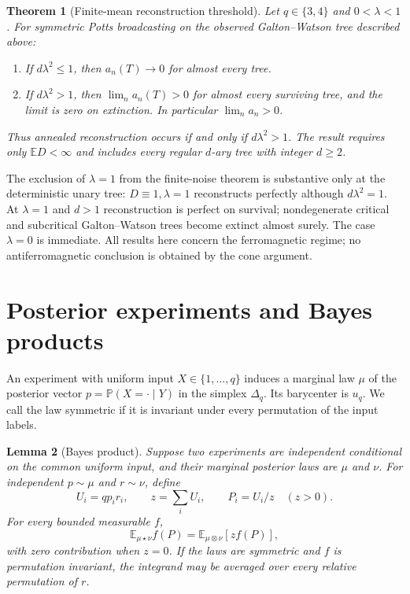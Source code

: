 \documentclass[11pt,reqno]{amsart}
\newtheorem{theorem}{Theorem}[section]
\newtheorem{lemma}[theorem]{Lemma}
\theoremstyle{definition}
\theoremstyle{remark}
\newcommand{\E}{\mathbb E}
\newcommand{\Prob}{\mathbb P}
\begin{document}
\begin{theorem}[Finite-mean reconstruction threshold]\label{thm:main}
Let $q\in\{3,4\}$ and $0<\lambda<1$. For symmetric Potts broadcasting on the observed Galton--Watson tree described above:
\begin{enumerate}
\item If $d\lambda^2\le1$, then $a_n(T)\to0$ for almost every tree.
\item If $d\lambda^2>1$, then $\lim_n a_n(T)>0$ for almost every surviving tree, and the limit is zero on extinction. In particular $\lim_n a_n>0$.
\end{enumerate}
Thus annealed reconstruction occurs if and only if $d\lambda^2>1$. The result requires only $\E D<\infty$ and includes every regular $d$-ary tree with integer $d\ge2$.
\end{theorem}

The exclusion of $\lambda=1$ from the finite-noise theorem is substantive only at the deterministic unary tree: $D\equiv1,\lambda=1$ reconstructs perfectly although $d\lambda^2=1$. At $\lambda=1$ and $d>1$ reconstruction is perfect on survival; nondegenerate critical and subcritical Galton--Watson trees become extinct almost surely. The case $\lambda=0$ is immediate. All results here concern the ferromagnetic regime; no antiferromagnetic conclusion is obtained by the cone argument.

\section{Posterior experiments and Bayes products}\label{sec:experiments}

An experiment with uniform input $X\in\{1,\ldots,q\}$ induces a marginal law $\mu$ of the posterior vector $p=\Prob(X=\cdot\mid Y)$ in the simplex $\Delta_q$. Its barycenter is $u_q$. We call the law symmetric if it is invariant under every permutation of the input labels.

\begin{lemma}[Bayes product]\label{lem:bayes}
Suppose two experiments are independent conditional on the common uniform input, and their marginal posterior laws are $\mu$ and $\nu$. For independent $p\sim\mu$ and $r\sim\nu$, define
\[
 U_i=q p_i r_i,\qquad z=\sum_iU_i,\qquad P_i=U_i/z\quad(z>0).
\]
For every bounded measurable $f$,
\begin{equation}\label{eq:bayes-product}
 \E_{\mu\star\nu}f(P)=\E_{\mu\otimes\nu}[z f(P)],
\end{equation}
with zero contribution when $z=0$. If the laws are symmetric and $f$ is permutation invariant, the integrand may be averaged over every relative permutation of $r$.
\end{lemma}
\end{document}
